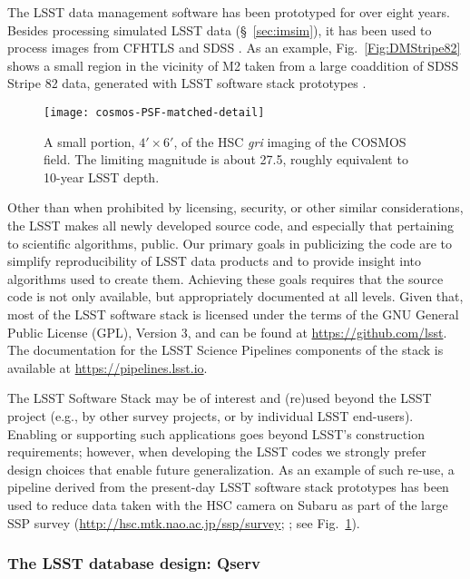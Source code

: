 The LSST data management software has been prototyped for over eight
years. Besides processing simulated LSST data
(\S~\ref{sec:imsim}), it has been used to process images from CFHTLS \citep{2012SPIE.8448E..0MC}
and SDSS \citep{2009ApJS..182..543A}. As an example,
Fig.~\ref{Fig:DMStripe82} shows a small region in the vicinity of M2
taken from a large coaddition of SDSS Stripe 82 data, generated with LSST
software stack prototypes \citep{DMTN-035}.
\\

\begin{figure}
\texttt{[image: cosmos-PSF-matched-detail]}
\caption{
  A small portion, $4' \times 6'$, of the HSC \textit{gri} imaging of
  the COSMOS field.  The limiting magnitude is about 27.5, roughly
  equivalent to 10-year LSST depth.
  }
\label{Fig:HSC_cosmos}
\end{figure}

Other than when prohibited by licensing, security, or other similar
considerations, the LSST makes all newly developed source code, and especially
that pertaining to scientific algorithms, public.  Our primary goals in
publicizing the code are to simplify reproducibility of LSST data products
and to provide insight into algorithms used to create them.  Achieving these goals requires
that the source code is not only available, but appropriately documented at all
levels.
Given that, most of the LSST software stack is licensed under the terms of the GNU General
Public License (GPL), Version 3, and can be found at \url{https://github.com/lsst}.
The documentation for the LSST Science Pipelines components of the stack is available at
\url{https://pipelines.lsst.io}.

The LSST Software Stack may be of interest and (re)used beyond the LSST project (e.g.,
by other survey projects, or by individual LSST end-users).  Enabling
or supporting such applications goes beyond LSST’s construction
requirements; however, when developing the LSST codes we strongly
prefer design choices that enable future generalization.  As an example of such
re-use, a pipeline derived from the present-day LSST software stack prototypes
has been used to reduce data taken with the HSC camera \citep{2018PASJ...70S...1M} on
Subaru as part of the large SSP survey (\url{http://hsc.mtk.nao.ac.jp/ssp/survey};
\citet{2018PASJ...70S...4A,2018PASJ...70S...5B}; see Fig.~\ref{Fig:HSC_cosmos}).



\subsubsection{The LSST database design: Qserv}
\label{sec:Qserv}

